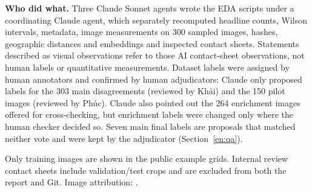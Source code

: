 \textbf{Who did what.} Three Claude Sonnet agents wrote the EDA scripts under a coordinating Claude agent, which separately recomputed headline counts, Wilson intervals, metadata, image measurements on 300 sampled images, hashes, geographic distances and embeddings and inspected contact sheets. Statements described as visual observations refer to those AI contact-sheet observations, not human labels or quantitative measurements. Dataset labels were assigned by human annotators and confirmed by human adjudicators: Claude only proposed labels for the 303 main disagreements (reviewed by Khải) and the 150 pilot images (reviewed by Phúc). Claude also pointed out the 264 enrichment images offered for cross-checking, but enrichment labels were changed only where the human checker decided so. Seven main final labels are proposals that matched neither vote and were kept by the adjudicator (Section~\ref{en:qa}).

Only training images are shown in the public example grids. Internal review contact sheets include validation/test crops and are excluded from both the report and Git. Image attribution: \cc.
